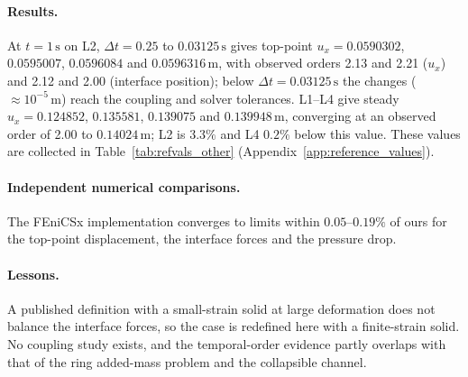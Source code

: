 \paragraph{Results.}
At $t = 1\,\mathrm{s}$ on L2, $\Delta t = 0.25$ to $0.03125\,\mathrm{s}$ gives top-point $u_x = 0.0590302$, $0.0595007$, $0.0596084$ and $0.0596316\,\mathrm{m}$, with observed orders 2.13 and 2.21 ($u_x$) and 2.12 and 2.00 (interface position); below $\Delta t = 0.03125\,\mathrm{s}$ the changes ($\approx10^{-5}\,\mathrm{m}$) reach the coupling and solver tolerances.
L1--L4 give steady $u_x = 0.124852$, $0.135581$, $0.139075$ and $0.139948\,\mathrm{m}$, converging at an observed order of 2.00 to $0.14024\,\mathrm{m}$; L2 is $3.3\%$ and L4 $0.2\%$ below this value.
These values are collected in Table~\ref{tab:refvals_other} (Appendix~\ref{app:reference_values}).

\paragraph{Independent numerical comparisons.}
The FEniCSx implementation converges to limits within $0.05$--$0.19\%$ of ours for the top-point displacement, the interface forces and the pressure drop.

\paragraph{Lessons.}
A published definition with a small-strain solid at large deformation does not balance the interface forces, so the case is redefined here with a finite-strain solid.
No coupling study exists, and the temporal-order evidence partly overlaps with that of the ring added-mass problem and the collapsible channel.
